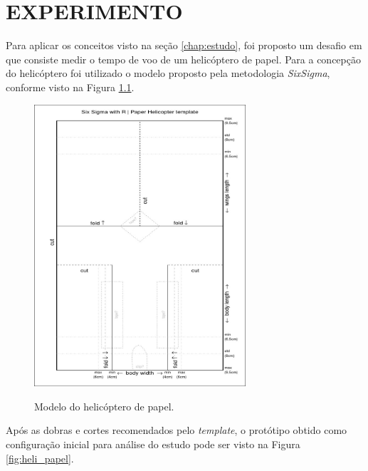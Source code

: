 \chapter{EXPERIMENTO}
\label{chap:experimento}

Para aplicar os conceitos visto na seção \ref{chap:estudo}, foi proposto um desafio em que consiste medir o tempo de voo de um helicóptero de papel. Para a concepção do helicóptero foi utilizado o modelo proposto pela metodologia \textit{SixSigma}, conforme visto na Figura \ref{fig:model_heli}. 

\begin{figure}[H]
  \caption{Modelo do helicóptero de papel.}
  \centering
  \includegraphics[width=0.7\textwidth]{images/helicopter.jpeg}
  \label{fig:model_heli}
\end{figure}

Após as dobras e cortes recomendados pelo \textit{template}, o protótipo obtido como configuração inicial para análise do estudo pode ser visto na Figura \ref{fig:heli_papel}.

